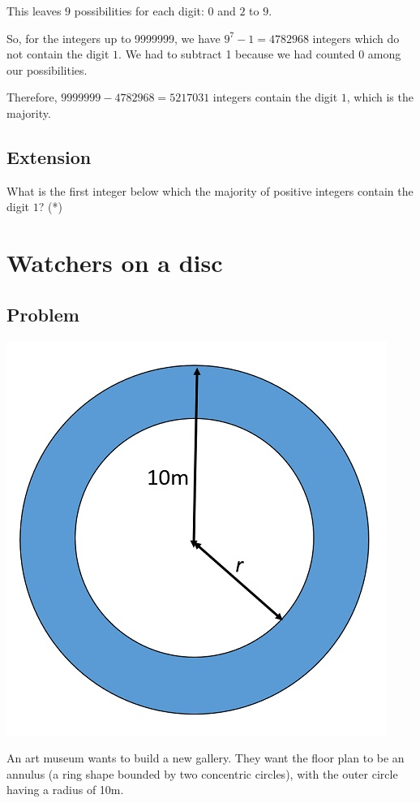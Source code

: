 \documentclass{book}
\begin{document}
This leaves \(9\) possibilities for each digit: \(0\) and \(2\) to \(9\).

So, for the integers up to 9999999, we have \(9^7-1=4782968\) integers which do not contain the digit \(1\). We had to subtract 1 because we had counted 0 among our possibilities.

Therefore, \(9999999-4782968=5217031\) integers contain the digit \(1\), which is the majority.
\subsection{Extension}
What is the first integer below which the majority of positive integers contain the digit \(1\)? (*)
\newpage
\section{Watchers on a disc}
\subsection{Problem}

\begin{center}
\includegraphics{annulus.jpg}
\end{center}

An art museum wants to build a new gallery. They want the floor plan to be an annulus (a ring shape bounded by two concentric circles), with the outer circle having a radius of 10m.
\end{document}
